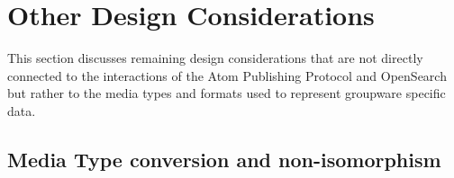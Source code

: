 \documentclass[11pt,a4paper,headsepline,twoside]{scrartcl}		%
\begin{document}



\section{Other Design Considerations}
\label{sec:design}

This section discusses remaining design considerations that are not directly
connected to the interactions of the Atom Publishing Protocol and OpenSearch but
rather to the media types and formats used to represent groupware specific data.






\subsection{Media Type conversion and non-isomorphism}
\end{document}
